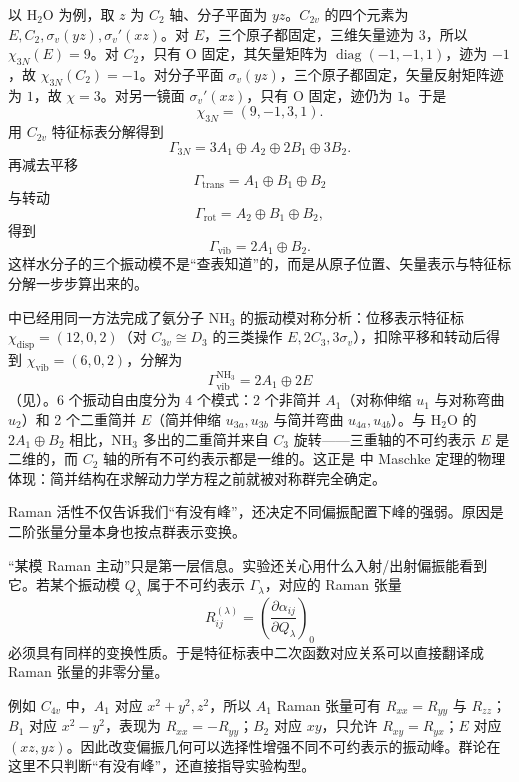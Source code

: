 以 $\mathrm{H_2O}$ 为例，取 $z$ 为 $C_2$ 轴、分子平面为 $yz$。$C_{2v}$ 的四个元素为 $E,C_2,\sigma_v(yz),\sigma_v'(xz)$。对 $E$，三个原子都固定，三维矢量迹为 $3$，所以 $\chi_{3N}(E)=9$。对 $C_2$，只有 O 固定，其矢量矩阵为 $\operatorname{diag}(-1,-1,1)$，迹为 $-1$，故 $\chi_{3N}(C_2)=-1$。对分子平面 $\sigma_v(yz)$，三个原子都固定，矢量反射矩阵迹为 $1$，故 $\chi=3$。对另一镜面 $\sigma_v'(xz)$，只有 O 固定，迹仍为 $1$。于是
\[
\chi_{3N}=(9,-1,3,1).
\]
用 $C_{2v}$ 特征标表分解得到
\[
\Gamma_{3N}=3A_1\oplus A_2\oplus2B_1\oplus3B_2.
\]
再减去平移
\[
\Gamma_{\mathrm{trans}}=A_1\oplus B_1\oplus B_2
\]
与转动
\[
\Gamma_{\mathrm{rot}}=A_2\oplus B_1\oplus B_2,
\]
得到
\[
\Gamma_{\mathrm{vib}}=2A_1\oplus B_2.
\]
这样水分子的三个振动模不是“查表知道”的，而是从原子位置、矢量表示与特征标分解一步步算出来的。

 中已经用同一方法完成了氨分子 $\mathrm{NH_3}$ 的振动模对称分析：位移表示特征标 $\chi_{\mathrm{disp}}=(12,0,2)$（对 $C_{3v}\cong D_3$ 的三类操作 $E,2C_3,3\sigma_v$），扣除平移和转动后得到 $\chi_{\mathrm{vib}}=(6,0,2)$，分解为
\[
\Gamma_{\mathrm{vib}}^{\mathrm{NH_3}}=2A_1\oplus 2E
\]
（见）。6 个振动自由度分为 4 个模式：2 个非简并 $A_1$（对称伸缩 $
u_1$ 与对称弯曲 $
u_2$）和 2 个二重简并 $E$（简并伸缩 $
u_{3a},
u_{3b}$ 与简并弯曲 $
u_{4a},
u_{4b}$）。与 $\mathrm{H_2O}$ 的 $2A_1\oplus B_2$ 相比，$\mathrm{NH_3}$ 多出的二重简并来自 $C_3$ 旋转——三重轴的不可约表示 $E$ 是二维的，而 $C_2$ 轴的所有不可约表示都是一维的。这正是 中 Maschke 定理的物理体现：简并结构在求解动力学方程之前就被对称群完全确定。

Raman 活性不仅告诉我们“有没有峰”，还决定不同偏振配置下峰的强弱。原因是二阶张量分量本身也按点群表示变换。

“某模 Raman 主动”只是第一层信息。实验还关心用什么入射/出射偏振能看到它。若某个振动模 $Q_\lambda$ 属于不可约表示 $\Gamma_\lambda$，对应的 Raman 张量
\[
R^{(\lambda)}_{ij}
=\left(\frac{\partial\alpha_{ij}}{\partial Q_\lambda}\right)_0
\]
必须具有同样的变换性质。于是特征标表中二次函数对应关系可以直接翻译成 Raman 张量的非零分量。

例如 $C_{4v}$ 中，$A_1$ 对应 $x^2+y^2,z^2$，所以 $A_1$ Raman 张量可有 $R_{xx}=R_{yy}$ 与 $R_{zz}$；$B_1$ 对应 $x^2-y^2$，表现为 $R_{xx}=-R_{yy}$；$B_2$ 对应 $xy$，只允许 $R_{xy}=R_{yx}$；$E$ 对应 $(xz,yz)$。因此改变偏振几何可以选择性增强不同不可约表示的振动峰。群论在这里不只判断“有没有峰”，还直接指导实验构型。
